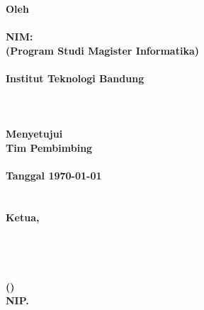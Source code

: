 \clearpage
{}

\begin{spacing}{1}
\begin{center}
  \smallskip
  \large \bfseries \MakeUppercase{\Title}\\
  \hfill\\
  \hfill\\
  \normalsize \normalfont Oleh\\
  \large \bfseries \AuthorName\\
  NIM:~\uppercase{\AuthorNIM}\\
  \normalsize (Program Studi Magister Informatika)\\
  \hfill\\
  \normalsize \normalfont Institut Teknologi Bandung \\
  \hfill\\
  \hfill\\
  \hfill\\
  Menyetujui\\
  Tim Pembimbing\\
  \hfill\\
  Tanggal \today \\
  \hfill\\
  \hfill\\
  Ketua,\\
  \hfill\\
  \hfill\\
  \hfill\\
  \hfill\\
  (\SupervisorName) \\
  NIP.\@ \uppercase{\SupervisorNIP} \\
\end{center}
\end{spacing}
